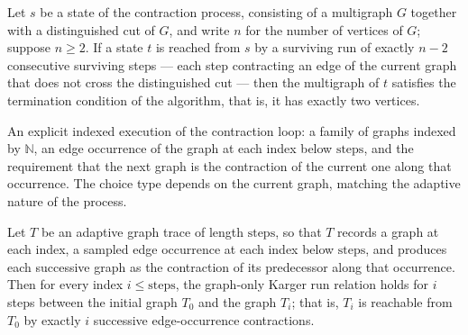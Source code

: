 \begin{lemma}
\label{KargerTrace.survivingRun_full_output}
\leanok
{}
Let $s$ be a state of the contraction process, consisting of a multigraph $G$ together
with a distinguished cut of $G$, and write $n$ for the number of vertices of $G$;
suppose $n \ge 2$. If a state $t$ is reached from $s$ by a surviving run of exactly $n -
2$ consecutive surviving steps — each step contracting an edge of the current graph that
does not cross the distinguished cut — then the multigraph of $t$ satisfies the
termination condition of the algorithm, that is, it has exactly two vertices.
\end{lemma}

\begin{definition}
\label{KargerTrace.KargerGraphTrace}
\leanok
{}
An explicit indexed execution of the contraction loop: a family of graphs indexed by
$\mathbb{N}$, an edge occurrence of the graph at each index below $\text{steps}$, and the
requirement that the next graph is the contraction of the current one along that
occurrence.  The choice type depends on the current graph, matching the adaptive nature of
the process.
\end{definition}

\begin{lemma}
\label{KargerTrace.kargerGraphTrace_prefix_run}
\leanok
{}
Let $T$ be an adaptive graph trace of length $\text{steps}$, so that $T$ records a graph
at each index, a sampled edge occurrence at each index below $\text{steps}$, and
produces each successive graph as the contraction of its predecessor along that
occurrence. Then for every index $i \le \text{steps}$, the graph-only Karger run
relation holds for $i$ steps between the initial graph $T_0$ and the graph $T_i$; that
is, $T_i$ is reachable from $T_0$ by exactly $i$ successive edge-occurrence
contractions.
\end{lemma}

